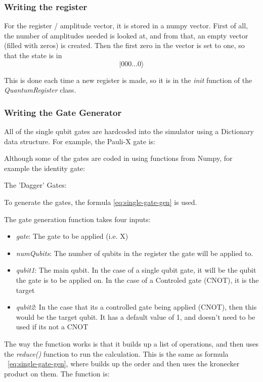 \documentclass[../main.tex]{subfiles}
\begin{document}
\subsubsection{Writing the register}
For the register / amplitude vector, it is stored in a numpy vector.
First of all, the number of amplitudes needed is looked at, and from that, an empty vector (filled with zeros) is created. Then the first zero in the vector is set to one, so that the state is in 
$$
\lvert 000...0 \rangle
$$

This is done each time a new register is made, so it is in the \emph{init} function of the \emph{QuantumRegister} class.



\subsubsection{Writing the Gate Generator}
All of the single qubit gates are hardcoded into the simulator using a Dictionary data structure. For example, the Pauli-X gate is:

Although some of the gates are coded in using functions from Numpy, for example the identity gate:

The 'Dagger' Gates:


To generate the gates, the formula \ref{eq:single-gate-gen}
is used.

The gate generation function takes four inputs:
\begin{itemize}
	\item \emph{gate}: The gate to be applied (i.e. X)
	\item \emph{numQubits}: The number of qubits in the register the gate will be applied to.
	\item \emph{qubit1}: The main qubit. In the case of a single qubit gate, it will be the qubit the gate is to be applied on. In the case of a Controled gate (CNOT), it is the target
	\item \emph{qubit2}: In the case that its a controlled gate being applied (CNOT), then this would be the target qubit. It has a default value of 1, and doesn't need to be used if its not a CNOT
\end{itemize}

The way the function works is that it builds up a list of operations, and then uses the \emph{reduce()} function to run the calculation. This is the same as formula ~\ref{eq:single-gate-gen}, where builds up the order and then uses the kronecker product on them. The function is:
\end{document}
